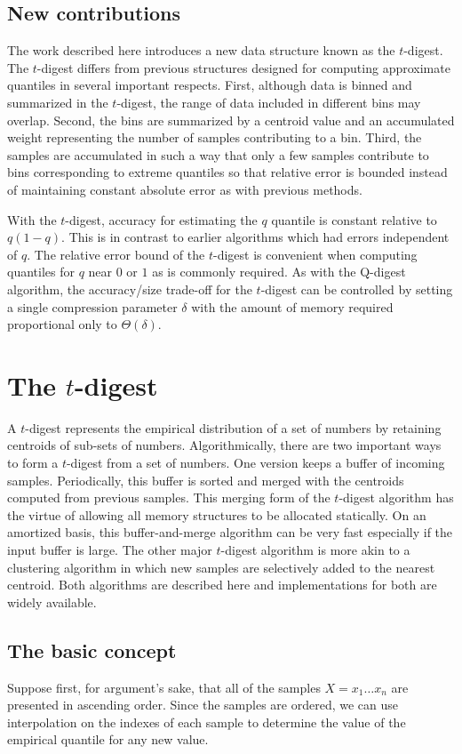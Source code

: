 \documentclass[11pt]{amsart}
\begin{document}
\subsection{New contributions}
The work described here introduces a new data structure known as the $t$-digest. The $t$-digest differs from previous structures designed for computing approximate quantiles in several important respects. First, although data is binned and summarized in the $t$-digest, the range of data included in different bins may overlap. Second, the bins are summarized by a centroid value and an accumulated weight representing the number of samples contributing to a bin. Third, the samples are accumulated in such a way that only a few samples contribute to bins corresponding to extreme quantiles so that relative error is bounded instead of maintaining constant absolute error as with previous methods.

With the $t$-digest, accuracy for estimating the $q$ quantile is constant relative to $q(1-q)$.  This is in contrast to earlier algorithms which had errors independent of $q$.  The relative error bound of the $t$-digest is convenient when computing quantiles for $q$ near $0$ or $1$ as is commonly required.  As with the Q-digest algorithm, the accuracy/size trade-off for the $t$-digest can be controlled by setting a single compression parameter $\delta$ with the amount of memory required proportional only to $\Theta(\delta)$. 
\section{The $t$-digest}
A $t$-digest represents the empirical distribution of a set of numbers by retaining centroids of sub-sets of numbers. Algorithmically, there are two important ways to form a $t$-digest from a set of numbers. One version keeps a buffer of incoming samples. Periodically, this buffer is sorted and merged with the centroids computed from previous samples. This merging form of the $t$-digest algorithm has the virtue of allowing all memory structures to be allocated statically. On an amortized basis, this buffer-and-merge algorithm can be very fast especially if the input buffer is large. The other major $t$-digest algorithm is more akin to a clustering algorithm in which new samples are selectively added to the nearest centroid.  Both algorithms are described here and implementations for both are widely available. 

\subsection{The basic concept}
Suppose first, for argument's sake, that all of the samples $X=x_1 \ldots x_n$ are presented in ascending order. Since the samples are ordered, we can use interpolation on the indexes of each sample to determine the value of the empirical quantile for any new value. 
\end{document}
